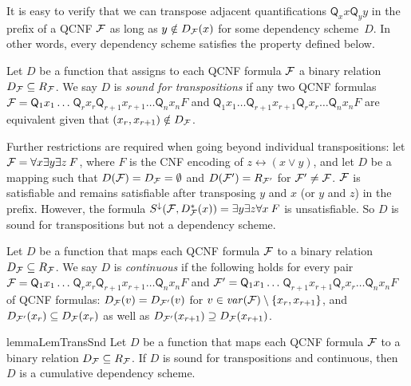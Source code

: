 \documentclass{llncs}
\newcommand{\shortversion}[1]{}
\begin{document}
It is easy to verify that we can transpose adjacent quantifications
$\mathsf{Q}_x x \mathsf{Q}_yy$ in the prefix of a QCNF $\mathcal{F}$ as long as $y
\notin D_{\mathcal{F}}(x)$ for some dependency scheme~$D$. In other words, every
dependency scheme satisfies the property defined below.
\begin{definition}
  \label{def:transsnd} Let $D$ be a function that assigns to each QCNF formula
  $\mathcal{F}$ a binary relation $D_{\mathcal{F}} \subseteq R_{\mathcal{F}}$. We say $D$ is
  \emph{sound for transpositions} if any two QCNF formulas $\mathcal{F} =
  \mathsf{Q}_1x_1\dots$\hskip 0pt$\mathsf{Q}_rx_r
  \mathsf{Q}_{r+1}x_{r+1}$\hskip 0pt$ \dots \mathsf{Q}_nx_n F$ and
  $\mathsf{Q}_1x_1\dots$\hskip 0pt$\mathsf{Q}_{r+1}x_{r+1}$\hskip 0pt$
  \mathsf{Q}_rx_r$\hskip 0pt$ \dots\mathsf{Q}_nx_n F$ are equivalent given
  that $(x_r,x_{r+1}) \notin D_{\mathcal{F}}$.
\end{definition}
Further restrictions are required when going beyond individual transpositions:
let $\mathcal{F} = \forall x \exists y \exists z\:F$, where $F$ is the CNF encoding
of $z \leftrightarrow (x \vee y)$, and let $D$ be a mapping such that
$D(\mathcal{F}) = D_{\mathcal{F}} = \emptyset$ and $D(\mathcal{F}') = R_{\mathcal{F}'}$ for $\mathcal{F}' \neq
\mathcal{F}$. $\mathcal{F}$ is satisfiable and remains satisfiable after transposing $y$ and
$x$ (or $y$ and $z$) in the prefix. However, the formula $S^{\downarrow}(\mathcal{F},
D^*_{\mathcal{F}}(x)) = \exists y \exists z \forall x\:F$ is unsatisfiable. So $D$ is
sound for transpositions but not a dependency scheme.
\begin{definition}[Continuous]
  \label{def:cont} Let $D$ be a function that maps each QCNF formula $\mathcal{F}$ to
  a binary relation $D_{\mathcal{F}} \subseteq R_{\mathcal{F}}$. We say $D$ is
  \emph{continuous} if the following holds for every pair $\mathcal{F} =
  \mathsf{Q}_1x_1\dots$\hskip 0pt$\mathsf{Q}_rx_r
  \mathsf{Q}_{r+1}x_{r+1}$\hskip 0pt$ \dots \mathsf{Q}_nx_n F$ and $\mathcal{F}' =
  \mathsf{Q}_1x_1\dots$\hskip 0pt$\mathsf{Q}_{r+1}x_{r+1}$\hskip 0pt$
  \mathsf{Q}_rx_r$\hskip 0pt$ \dots\mathsf{Q}_nx_n F$ of QCNF formulas:
  $D_{\mathcal{F}}(v) = D_{\mathcal{F}'}(v)$ for $v \in \mathit{var}(\mathcal{F}) \setminus \{ x_r,
  x_{r+1}\}$, and $D_{\mathcal{F}'}(x_r) \subseteq D_{\mathcal{F}}(x_r)$ as well as
  $D_{\mathcal{F}'}(x_{r+1}) \supseteq D_{\mathcal{F}}(x_{r+1})$.
\end{definition}
\begin{restatable}{lemma}{LemTransSnd} \label{lem:transsnd}\shortversion{\textup{($\star$)}}
  Let $D$ be a function that maps each QCNF formula $\mathcal{F}$ to a binary
  relation $D_{\mathcal{F}} \subseteq R_{\mathcal{F}}$. If $D$ is sound for transpositions
  and continuous, then $D$ is a cumulative dependency scheme.
\end{restatable}
\end{document}
